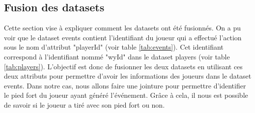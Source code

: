 \documentclass[12pt]{article}
\begin{document}
\subsection{Fusion des datasets}
Cette section vise à expliquer comment les datasets ont été fusionnés.
On a pu voir que le dataset events contient l'identifiant du joueur qui a effectué l'action sous le nom d'attribut "playerId" (voir table \ref{tab:events}).
Cet identifiant correspond à l'identifiant nommé "wyId" dans le dataset players (voir table \ref{tab:players}).
L'objectif est donc de fusionner les deux datasets en utilisant ces deux attributs pour permettre d'avoir les informations des joueurs dans le dataset events.
Dans notre cas, nous allons faire une jointure pour permettre d'identifier le pied fort du joueur ayant généré l'événement.
Grâce à cela, il nous est possible de savoir si le joueur a tiré avec son pied fort ou non.
\newline\newline
\end{document}

